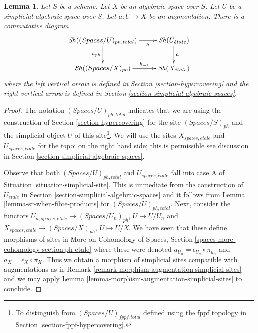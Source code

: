 \documentclass{stacks-project}
\theoremstyle{plain}
\newtheorem{lemma}[subsection]{Lemma}
\theoremstyle{definition}
\theoremstyle{remark}
\numberwithin{equation}{subsection}
\def\Sh{\mathop{\mathit{Sh}}\nolimits}
\def\etale{{\acute{e}tale}}
\begin{document}
\begin{lemma}
\label{lemma-compare-simplicial-objects-ph-etale}
Let $S$ be a scheme. Let $X$ be an algebraic space over $S$.
Let $U$ be a simplicial algebraic space over $S$.
Let $a : U \to X$ be an augmentation. There is a commutative diagram
$$
\xymatrix{
\Sh((\textit{Spaces}/U)_{ph, total}) \ar[r]_-h \ar[d]_{a_{ph}} &
\Sh(U_\etale) \ar[d]^a \\
\Sh((\textit{Spaces}/X)_{ph}) \ar[r]^-{h_{-1}} &
\Sh(X_\etale)
}
$$
where the left vertical arrow is defined in
Section \ref{section-hypercovering}
and the right vertical arrow is defined in
Section \ref{section-simplicial-algebraic-spaces}.
\end{lemma}

\begin{proof}
The notation $(\textit{Spaces}/U)_{ph, total}$ indicates that
we are using the construction of
Section \ref{section-hypercovering}
for the site $(\textit{Spaces}/S)_{ph}$ and the
simplicial object $U$ of this site\footnote{To distinguish from
$(\textit{Spaces}/U)_{fppf, total}$ defined using the fppf
topology in Section \ref{section-fppf-hypercovering}.}.
We will use the sites $X_{spaces, \etale}$ and $U_{spaces, \etale}$
for the topoi on the right hand side; this is permissible
see discussion in Section \ref{section-simplicial-algebraic-spaces}.

\medskip\noindent
Observe that both $(\textit{Spaces}/U)_{ph, total}$ and
$U_{spaces, \etale}$
fall into case A of Situation \ref{situation-simplicial-site}.
This is immediate from the construction of
$U_\etale$ in Section \ref{section-simplicial-algebraic-spaces}
and it follows from Lemma \ref{lemma-sr-when-fibre-products}
for $(\textit{Spaces}/U)_{ph, total}$.
Next, consider the functors
$U_{n, spaces, \etale} \to (\textit{Spaces}/U_n)_{ph}$, $U \mapsto U/U_n$
and
$X_{spaces, \etale} \to (\textit{Spaces}/X)_{ph}$, $U \mapsto U/X$.
We have seen that these define morphisms of sites in
More on Cohomology of Spaces, Section
\ref{spaces-more-cohomology-section-ph-etale}
where these were denoted $a_{U_n} = \epsilon_{U_n} \circ \pi_{u_n}$
and $a_X = \epsilon_X \circ \pi_X$.
Thus we obtain a morphism of simplicial sites compatible with
augmentations as in Remark \ref{remark-morphism-augmentation-simplicial-sites}
and we may apply
Lemma \ref{lemma-morphism-augmentation-simplicial-sites} to conclude.
\end{proof}
\end{document}
